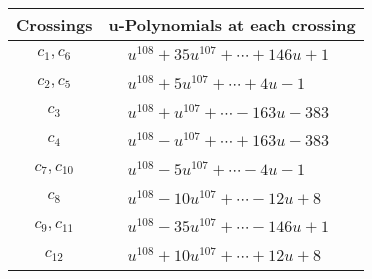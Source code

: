 \documentclass[1p]{elsarticle_modified}
\theoremstyle{definition}
\begin{document}
\begin{tabular}{m{50pt}|m{274pt}}
Crossings & \hspace{64pt}u-Polynomials at each crossing \\
\hline $$\begin{aligned}c_{1},c_{6}\end{aligned}$$&$\begin{aligned}
&u^{108}+35 u^{107}+\cdots+146 u+1
\end{aligned}$\\
\hline $$\begin{aligned}c_{2},c_{5}\end{aligned}$$&$\begin{aligned}
&u^{108}+5 u^{107}+\cdots+4 u-1
\end{aligned}$\\
\hline $$\begin{aligned}c_{3}\end{aligned}$$&$\begin{aligned}
&u^{108}+u^{107}+\cdots-163 u-383
\end{aligned}$\\
\hline $$\begin{aligned}c_{4}\end{aligned}$$&$\begin{aligned}
&u^{108}- u^{107}+\cdots+163 u-383
\end{aligned}$\\
\hline $$\begin{aligned}c_{7},c_{10}\end{aligned}$$&$\begin{aligned}
&u^{108}-5 u^{107}+\cdots-4 u-1
\end{aligned}$\\
\hline $$\begin{aligned}c_{8}\end{aligned}$$&$\begin{aligned}
&u^{108}-10 u^{107}+\cdots-12 u+8
\end{aligned}$\\
\hline $$\begin{aligned}c_{9},c_{11}\end{aligned}$$&$\begin{aligned}
&u^{108}-35 u^{107}+\cdots-146 u+1
\end{aligned}$\\
\hline $$\begin{aligned}c_{12}\end{aligned}$$&$\begin{aligned}
&u^{108}+10 u^{107}+\cdots+12 u+8
\end{aligned}$\\
\hline
\end{tabular}\\~\\
\end{document}
